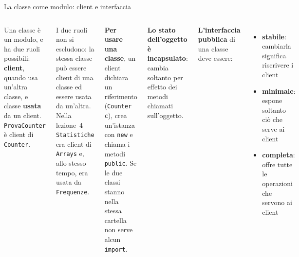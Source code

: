 \documentclass[10pt,aspectratio=169]{beamer}
\begin{document}
\begin{frame}[fragile]{La classe come modulo: client e interfaccia}
\begin{columns}[T]

\small
Una classe è un modulo, e ha due ruoli possibili: \textbf{client}, quando usa un'altra classe, e classe \textbf{usata} da un client. \texttt{ProvaCounter} è client di \texttt{Counter}.

\vspace{0.1cm}
I due ruoli non si escludono: la stessa classe può essere client di una classe ed essere usata da un'altra. Nella lezione~4 \texttt{Statistiche} era client di \texttt{Arrays} e, allo stesso tempo, era usata da \texttt{Frequenze}.

\vspace{0.1cm}
\textbf{Per usare una classe}, un client dichiara un riferimento (\texttt{Counter c}), crea un'istanza con \texttt{new} e chiama i metodi \texttt{public}. Se le due classi stanno nella stessa cartella non serve alcun \texttt{import}.

\vspace{0.1cm}
\textbf{Lo stato dell'oggetto è incapsulato}: cambia soltanto per effetto dei metodi chiamati sull'oggetto.

\vspace{0.1cm}
\textbf{L'interfaccia pubblica} di una classe deve essere:
\begin{itemize}\itemsep=1pt
    \item \textbf{stabile}: cambiarla significa riscrivere i client
    \item \textbf{minimale}: espone soltanto ciò che serve ai client
    \item \textbf{completa}: offre tutte le operazioni che servono ai client
\end{itemize}
\end{columns}
\end{frame}
\end{document}
